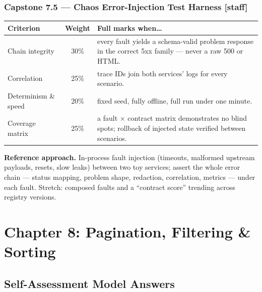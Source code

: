 \subsubsection*{Capstone 7.5 --- Chaos Error-Injection Test Harness [staff]}
\begin{center}\small
\begin{tabularx}{\textwidth}{l c X}
\toprule
\textbf{Criterion} & \textbf{Weight} & \textbf{Full marks when\ldots} \\
\midrule
Chain integrity & 30\% & every fault yields a schema-valid problem response in the correct 5xx family --- never a raw 500 or HTML. \\
Correlation & 25\% & trace IDs join both services' logs for every scenario. \\
Determinism \& speed & 20\% & fixed seed, fully offline, full run under one minute. \\
Coverage matrix & 25\% & a fault $\times$ contract matrix demonstrates no blind spots; rollback of injected state verified between scenarios. \\
\bottomrule
\end{tabularx}
\end{center}
\textbf{Reference approach.} In-process fault injection (timeouts, malformed
upstream payloads, resets, slow leaks) between two toy services; assert the
whole error chain --- status mapping, problem shape, redaction,
correlation, metrics --- under each fault. Stretch: composed faults and a
``contract score'' trending across registry versions.

\section{Chapter 8: Pagination, Filtering \& Sorting}
\label{sec:sol-ch8}

\subsection{Self-Assessment Model Answers}

